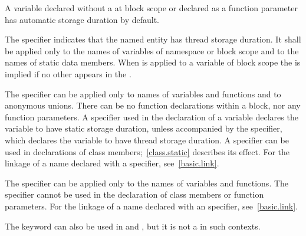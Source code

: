\pnum
\begin{note}
A variable declared without a 
at block scope or declared as a function parameter
has automatic storage duration by default.
\end{note}

\pnum
The  specifier
indicates that the named entity has thread storage duration. It
shall be applied only
to the names of variables of namespace
or block scope and to the names of static data members.
When  is applied to a variable of block scope the
  is implied if no other
 appears in the
.

\pnum
{}%
The  specifier can be applied only to names of variables and
functions and to anonymous unions. There can be no
 function declarations within a block, nor any
 function parameters. A  specifier used in
the declaration of a variable declares the variable to have static storage
duration, unless accompanied by the
 specifier, which declares the variable to have thread
storage duration. A  specifier can be
used in declarations of class members;~\ref{class.static} describes its
effect.
%
For the linkage of a name declared with a  specifier,
see~\ref{basic.link}.

\pnum
{}%
The  specifier can be applied only to the names of variables
and functions. The  specifier cannot be used in the
declaration of class members or function parameters.
%
%
For the linkage of a name declared with an  specifier,
see~\ref{basic.link}.
\begin{note}
The  keyword can also be used in
 and
, but it is not a
 in such contexts.
\end{note}

